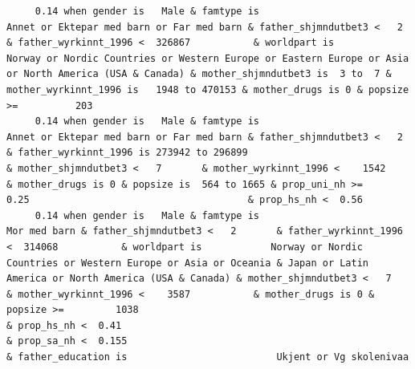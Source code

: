 \documentclass[
  letterpaper,
  DIV=11,
  numbers=noendperiod]{scrreprt}
\begin{document}
\begin{verbatim}
     0.14 when gender is   Male & famtype is                        Annet or Ektepar med barn or Far med barn & father_shjmndutbet3 <   2       & father_wyrkinnt_1996 <  326867           & worldpart is                              Norway or Nordic Countries or Western Europe or Eastern Europe or Asia or North America (USA & Canada) & mother_shjmndutbet3 is  3 to  7 & mother_wyrkinnt_1996 is   1948 to 470153 & mother_drugs is 0 & popsize >=          203                                                                                                                                                                                                                                                                                                                                                                                                               
     0.14 when gender is   Male & famtype is                        Annet or Ektepar med barn or Far med barn & father_shjmndutbet3 <   2       & father_wyrkinnt_1996 is 273942 to 296899                                                                                                                                                    & mother_shjmndutbet3 <   7       & mother_wyrkinnt_1996 <    1542           & mother_drugs is 0 & popsize is  564 to 1665 & prop_uni_nh >=         0.25                                      & prop_hs_nh <  0.56                                                                                                                                                                                                                                                                                                                       
     0.14 when gender is   Male & famtype is                                                     Mor med barn & father_shjmndutbet3 <   2       & father_wyrkinnt_1996 <  314068           & worldpart is            Norway or Nordic Countries or Western Europe or Asia or Oceania & Japan or Latin America or North America (USA & Canada) & mother_shjmndutbet3 <   7       & mother_wyrkinnt_1996 <    3587           & mother_drugs is 0 & popsize >=         1038                                                                    & prop_hs_nh <  0.41                                                                                                                                                   & prop_sa_nh <  0.155                                                     & father_education is                          Ukjent or Vg skolenivaa                    

\end{verbatim}
\end{document}
